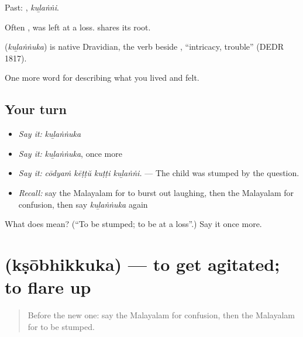Past: , \emph{kuḻaṅṅi}.

Often , was left at a loss.  shares its root.

\begin{cousinweb}
\textbf{} (\emph{kuḻaṅṅuka}) is native Dravidian, the verb beside , \textquotedblleft{}intricacy, trouble\textquotedblright{} (DEDR 1817).
\end{cousinweb}

\begin{grammarlens}[title={What you've built}]
One more word for describing what you lived and felt.
\end{grammarlens}

\subsection*{Your turn}
\begin{itemize}
\raggedright
  \item \emph{Say it:} \emph{kuḻaṅṅuka}
  \item \emph{Say it:} \emph{kuḻaṅṅuka}, once more
  \item \emph{Say it:} \emph{cōdyaṁ kēṭṭŭ kuṭṭi kuḻaṅṅi.} — The child was stumped by the question.
  \item \emph{Recall:} say the Malayalam for to burst out laughing, then the Malayalam for confusion, then say \emph{kuḻaṅṅuka} again
\end{itemize}

\begin{tcolorbox}[breakable,colback=teal!4,colframe=teal!35!black,title={Before you move on}]
What does  mean? (\textquotedblleft{}To be stumped; to be at a loss\textquotedblright{}.) Say it once more.
\end{tcolorbox}
\section[\texorpdfstring{\ml{ക്ഷോഭിക്കുക} (kṣōbhikkuka)}{ക്ഷോഭിക്കുക (kṣōbhikkuka)}]{ (kṣōbhikkuka) — to get agitated; to flare up}

\label{lesson:ML-C526-ksobhikkuka}



\begin{quote}
Before the new one: say the Malayalam for confusion, then the Malayalam for to be stumped.
\end{quote}

